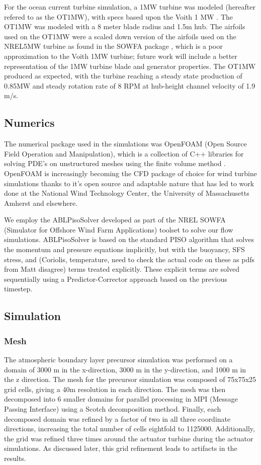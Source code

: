 For the ocean current turbine simulation, a 1MW turbine was modeled (hereafter refered to as the OT1MW), with specs based upon the Voith 1 MW \cite{Voith}. The OT1MW was modeled with a 8 meter blade radius and 1.5m hub. The airfoils used on the OT1MW were a scaled down version of the airfoils used on the NREL5MW turbine as found in the SOWFA package \cite{SOWFA}, which is a poor approximation to the Voith 1MW turbine; future work will include a better representation of the 1MW turbine blade and generator properties. The OT1MW produced as expected, with the turbine reaching a steady state production of 0.85MW and steady rotation rate of 8 RPM at hub-height channel velocity of 1.9 m/s.



\subsection{Numerics}


The numerical package used in the simulations was OpenFOAM (Open Source Field Operation and Manipulation), which is a collection of C++ libraries for solving PDE's on unstructured meshes using the finite volume method \cite{OpenFOAM}. OpenFOAM is increasingly becoming the CFD package of choice for wind turbine simulations thanks to it's open source and adaptable nature that has led to work done at the National Wind Technology Center, the University of Massachusetts Amherst and elsewhere.

We employ the ABLPisoSolver developed as part of the NREL SOWFA (Simulator for Offshore Wind Farm Applications) toolset \cite{SOWFA} to solve our flow simulations.  ABLPisoSolver is based on the standard PISO algorithm that solves the momentum and pressure equations implicitly, but with the buoyancy, SFS stress, and (Coriolis, temperature, need to check the actual code on these as pdfs from Matt disagree) terms treated explicitly.  These explicit terms are solved sequentially using a Predictor-Corrector approach based on the previous timestep.  

\subsection{Simulation}


\subsubsection{Mesh}

The atmospheric boundary layer precursor simulation was performed on a domain of 3000 m in the x-direction, 3000 m in the y-direction, and 1000 m in the z direction.  The mesh for the precursor simulation was composed of 75x75x25 grid cells, giving a 40m resolution in each direction.  The mesh was then decomposed into 6 smaller domains for parallel processing in MPI (Message Passing Interface) using a Scotch decomposition method.  Finally, each decomposed domain was refined by a factor of two in all three coordinate directions, increasing the total number of cells eightfold to 1125000.  Additionally, the grid was refined three times around the actuator turbine during the actuator simulations.  As discussed later, this grid refinement leads to artifacts in the results.

